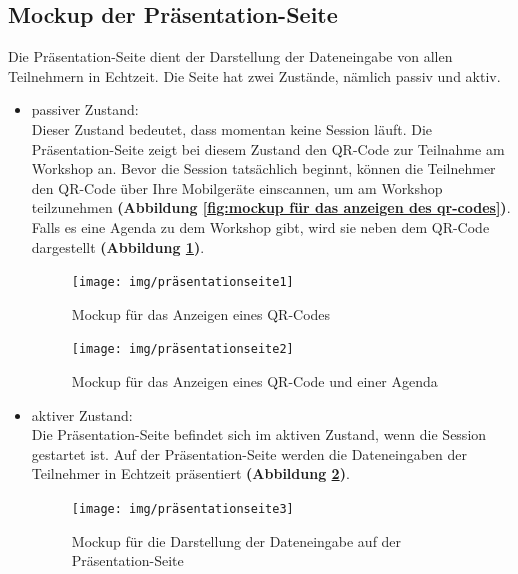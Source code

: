 \subsection{Mockup der Präsentation-Seite}
\label{subsec:mockup der präsentation-seite}
Die Präsentation-Seite dient der Darstellung der Dateneingabe von allen Teilnehmern in Echtzeit. Die Seite hat zwei Zustände, nämlich passiv und aktiv.

\begin{itemize}
\item passiver Zustand:\\
Dieser Zustand bedeutet, dass momentan keine Session läuft. Die Präsentation-Seite zeigt bei diesem Zustand den QR-Code zur Teilnahme am Workshop an. Bevor die Session tatsächlich beginnt, können die Teilnehmer den QR-Code über Ihre Mobilgeräte einscannen, um am Workshop teilzunehmen \textbf{(Abbildung \ref{fig:mockup für das anzeigen des qr-codes})}. Falls es eine Agenda zu dem Workshop gibt, wird sie neben dem QR-Code dargestellt \textbf{(Abbildung \ref{fig:mockup für das anzeigen eines qr-code und einer agenda})}.\bigskip

\begin{figure}[H]
	\centering
  \begin{minipage}[t]{0.45\linewidth}
  	    \texttt{[image: img/präsentationseite1]}
		\caption{Mockup für das Anzeigen eines QR-Codes}
		\label{fig:mockup für das anzeigen des qr-codes}
  \end{minipage}
\hfill
  \begin{minipage}[t]{0.45\linewidth}
    	    \texttt{[image: img/präsentationseite2]}
		\caption{Mockup für das Anzeigen eines QR-Code und einer Agenda}
		\label{fig:mockup für das anzeigen eines qr-code und einer agenda}
  \end{minipage}
\end{figure}

\newpage
\item aktiver Zustand:\\
Die Präsentation-Seite befindet sich im aktiven Zustand, wenn die Session gestartet ist. Auf der Präsentation-Seite werden die Dateneingaben der Teilnehmer in Echtzeit präsentiert \textbf{(Abbildung \ref{fig:mockup für die darstellung der dateneingabe auf der präsentation-seite})}.\bigskip

\begin{figure}[H]
  \begin{center}
    \texttt{[image: img/präsentationseite3]}
	\caption{Mockup für die Darstellung der Dateneingabe auf der Präsentation-Seite}  
	\label{fig:mockup für die darstellung der dateneingabe auf der präsentation-seite}
  \end{center}   
\end{figure}


\end{itemize}
